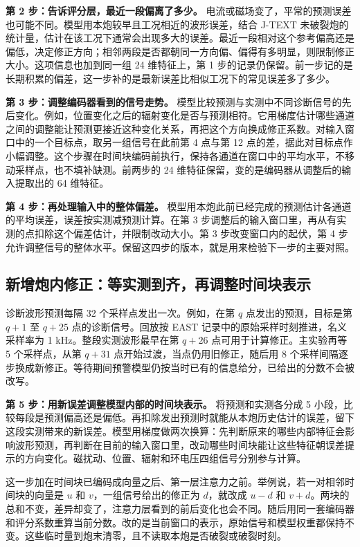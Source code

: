 \textbf{第 2 步：告诉评分层，最近一段偏离了多少。} 电流或磁场变了，平常的预测误差也可能不同。模型用本炮较早且工况相近的波形误差，结合 J-TEXT 未破裂炮的统计量，估计在该工况下通常会出现多大的误差。最近一段相对这个参考偏高还是偏低，决定修正方向；相邻两段是否都朝同一方向偏、偏得有多明显，则限制修正大小。这项信息也加到同一组 24 维特征上，第 1 步的记录仍保留。前一步记的是长期积累的偏差，这一步补的是最新误差比相似工况下的常见误差多了多少。

\textbf{第 3 步：调整编码器看到的信号走势。} 模型比较预测与实测中不同诊断信号的先后变化。例如，位置变化之后的辐射变化是否与预测相符。它用梯度估计哪些通道之间的调整能让预测更接近这种变化关系，再把这个方向换成修正系数。对输入窗口中的一个目标点，取另一组信号在此前第 4 点与第 12 点的差，据此对目标点作小幅调整。这个步骤在时间块编码前执行，保持各通道在窗口中的平均水平，不移动采样点，也不填补缺测。前两步的 24 维特征保留，变的是编码器从调整后的输入提取出的 64 维特征。

\textbf{第 4 步：再处理输入中的整体偏差。} 模型用本炮此前已经完成的预测估计各通道的平均误差，误差按实测减预测计算。在第 3 步调整后的输入窗口里，再从有实测的点扣除这个偏差估计，并限制改动大小。第 3 步改变窗口内的起伏，第 4 步允许调整信号的整体水平。保留这四步的版本，就是用来检验下一步的主要对照。

\subsection{新增炮内修正：等实测到齐，再调整时间块表示}

诊断波形预测每隔 32 个采样点发出一次。例如，在第 \(q\) 点发出的预测，目标是第 \(q+1\) 至 \(q+25\) 点的诊断信号。回放按 EAST 记录中的原始采样时刻推进，名义采样率为 1 kHz。整段实测波形最早在第 \(q+26\) 点可用于计算修正。主实验再等 5 个采样点，从第 \(q+31\) 点开始过渡，当点仍用旧修正，随后用 8 个采样间隔逐步换成新修正。等待期间预警模型仍按当时已有的信息给分，已给出的分数不会被改写。

\textbf{第 5 步：用新误差调整模型内部的时间块表示。} 将预测和实测各分成 5 小段，比较每段是预测偏高还是偏低。再扣除发出预测时就能从本炮历史估计的误差，留下这段实测带来的新误差。模型用梯度做两次换算：先判断原来的哪些内部特征会影响波形预测，再判断在目前的输入窗口里，改动哪些时间块能让这些特征朝误差提示的方向变化。磁扰动、位置、辐射和环电压四组信号分别参与计算。

这一步加在时间块已编码成向量之后、第一层注意力之前。举例说，若一对相邻时间块的向量是 \(u\) 和 \(v\)，一组信号给出的修正为 \(d\)，就改成 \(u-d\) 和 \(v+d\)。两块的总和不变，差异却变了，注意力层看到的前后变化也会不同。随后用同一套编码器和评分系数重算当前分数。改的是当前窗口的表示，原始信号和模型权重都保持不变。这些临时量到炮末清零，且不读取本炮是否破裂或破裂时刻。


